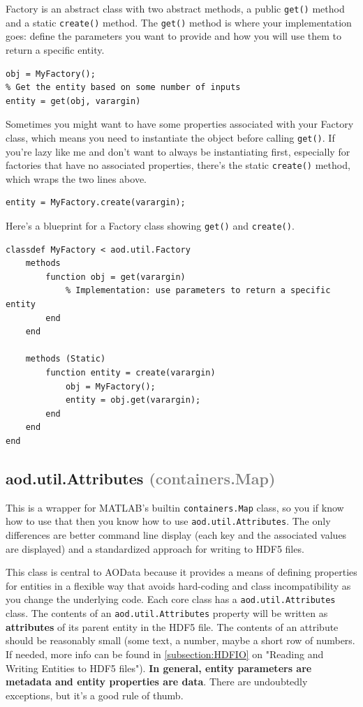\documentclass[10pt]{exam}
\newcommand\myurl[1]{\textcolor{blue}{\underline{#1}}}
\newcommand\myparent[1]{\textcolor{gray}{(#1)}}
\newcommand\aodclass[1]{\textcolor{codeblue}{\texttt{#1}}}
\newcommand\aodfcn[1]{\textcolor{darkteal}{\texttt{#1}}}
\begin{document}
		Factory is an abstract class with two abstract methods, a public \aodfcn{get()} method and a static \aodfcn{create()} method. The \aodfcn{get()} method is where your implementation goes: define the parameters you want to provide and how you will use them to return a specific entity. 
		\begin{lstlisting}[style=matlab-editor, basicstyle=\mlttfamily\footnotesize]
% Instantiate the object
obj = MyFactory();
% Get the entity based on some number of inputs
entity = get(obj, varargin)
		\end{lstlisting}
		Sometimes you might want to have some properties associated with your Factory class, which means you need to instantiate the object before calling \aodfcn{get()}. If you're lazy like me and don't want to always be instantiating first, especially for factories that have no associated properties, there's the static \aodfcn{create()} method, which wraps the two lines above.
		\begin{lstlisting}[style=matlab-editor, basicstyle=\mlttfamily\footnotesize]
% Get the entity using create
entity = MyFactory.create(varargin);
		\end{lstlisting}
		Here's a blueprint for a Factory class showing \aodfcn{get()} and \aodfcn{create()}.
		\begin{lstlisting}[style=matlab-editor, basicstyle=\mlttfamily\footnotesize]
classdef MyFactory < aod.util.Factory
	methods 
		function obj = get(varargin)
			% Implementation: use parameters to return a specific entity
		end
	end

	methods (Static)
		function entity = create(varargin)
			obj = MyFactory();
			entity = obj.get(varargin);
		end
	end
end
		\end{lstlisting}
		
	\subsection{aod.util.Attributes \myparent{containers.Map}}
		\noindent  This is a wrapper for MATLAB's builtin \aodclass{containers.Map} class, so you if know how to use that then you know how to use \aodclass{aod.util.Attributes}. The only differences are better command line display (each key and the associated values are displayed) and a standardized approach for writing to HDF5 files. 
		
		This class is central to AOData because it provides a means of defining properties for entities in a flexible way that avoids hard-coding and class incompatibility as you change the underlying code. 
		Each core class has a \aodclass{aod.util.Attributes} class. The contents of an \aodclass{aod.util.Attributes} property will be written as \textbf{attributes} of its parent entity in the HDF5 file. The contents of an attribute should be reasonably small (some text, a number, maybe a short row of numbers. If needed, more info can be found in \myurl{\ref{subsection:HDFIO}} on "Reading and Writing Entities to HDF5 files").  \textbf{In general, entity parameters are metadata and entity properties are data}. There are undoubtedly exceptions, but it's a good rule of thumb.
		
\end{document}
